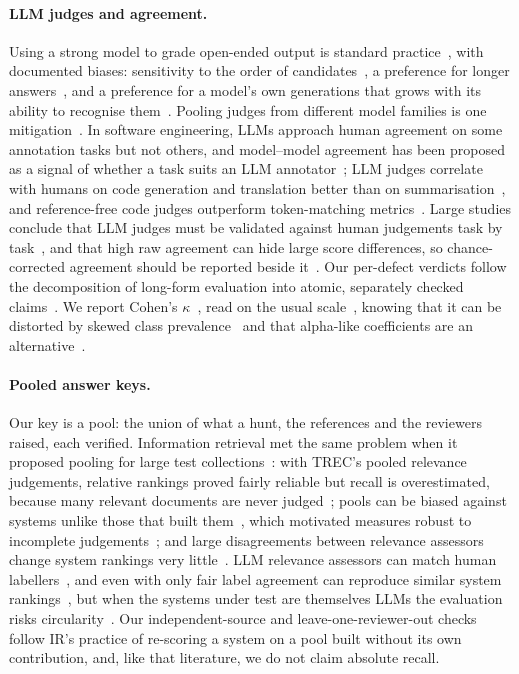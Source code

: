 \documentclass[11pt,a4paper]{article}
\begin{document}
\paragraph{LLM judges and agreement.} Using a strong model to grade
open-ended output is standard practice~\cite{zheng2023,gu2024survey}, with
documented biases: sensitivity to the order of
candidates~\cite{wang2024fair,zheng2023}, a preference for longer
answers~\cite{zheng2023}, and a preference for a model's own generations that
grows with its ability to recognise them~\cite{panickssery2024}. Pooling
judges from different model families is one mitigation~\cite{verga2024}. In
software engineering, LLMs approach human agreement on some annotation tasks
but not others, and model--model agreement has been proposed as a signal of
whether a task suits an LLM annotator~\cite{ahmed2025}; LLM judges correlate
with humans on code generation and translation better than on
summarisation~\cite{wang2025sejudge}, and reference-free code judges
outperform token-matching metrics~\cite{tong2024codejudge,zhuo2024icescore}.
Large studies conclude that LLM judges must be validated against human
judgements task by task~\cite{bavaresco2025,shankar2024}, and that high raw
agreement can hide large score differences, so chance-corrected agreement
should be reported beside it~\cite{thakur2025}. Our per-defect verdicts
follow the decomposition of long-form evaluation into atomic, separately
checked claims~\cite{min2023factscore}. We report Cohen's
$\kappa$~\cite{cohen1960}, read on the usual scale~\cite{landis1977}, knowing
that it can be distorted by skewed class prevalence~\cite{feinstein1990} and
that alpha-like coefficients are an alternative~\cite{artstein2008,hayes2007}.

\paragraph{Pooled answer keys.} Our key is a pool: the union of what a hunt,
the references and the reviewers raised, each verified. Information retrieval
met the same problem when it proposed pooling for large test
collections~\cite{sparckjones1975}: with TREC's pooled relevance judgements,
relative rankings proved fairly reliable but recall is overestimated, because
many relevant documents are never judged~\cite{zobel1998}; pools can be biased
against systems unlike those that built them~\cite{buckley2007}, which
motivated measures robust to incomplete judgements~\cite{buckley2004}; and
large disagreements between relevance assessors change system rankings very
little~\cite{voorhees2000}. LLM relevance assessors can match human
labellers~\cite{thomas2024}, and even with only fair label agreement can
reproduce similar system rankings~\cite{faggioli2023}, but when the systems under test are
themselves LLMs the evaluation risks circularity~\cite{clarke2025}. Our
independent-source and leave-one-reviewer-out checks follow IR's practice of
re-scoring a system on a pool built without its own contribution, and, like
that literature, we do not claim absolute recall.
\end{document}
